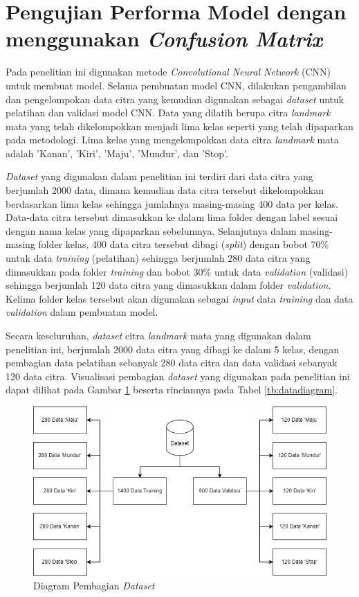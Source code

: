 \section{Pengujian Performa Model dengan menggunakan \emph{Confusion Matrix}}

Pada penelitian ini digunakan metode \emph{Convolutional Neural Network} (CNN) untuk membuat model. Selama pembuatan model CNN, dilakukan pengambilan dan pengelompokan data citra yang kemudian digunakan sebagai \emph{dataset} untuk pelatihan dan validasi model CNN. Data yang dilatih berupa citra \emph{landmark} mata yang telah dikelompokkan menjadi lima kelas seperti yang telah dipaparkan pada metodologi. Lima kelas yang mengelompokkan data citra \emph{landmark} mata adalah 'Kanan', 'Kiri', 'Maju', 'Mundur', dan 'Stop'.

\emph{Dataset} yang digunakan dalam penelitian ini terdiri dari data citra yang berjumlah 2000 data, dimana kemudian data citra tersebut dikelompokkan berdasarkan lima kelas sehingga jumlahnya masing-masing 400 data per kelas. Data-data citra tersebut dimasukkan ke dalam lima folder dengan label sesuai dengan nama kelas yang dipaparkan sebelumnya. Selanjutnya dalam masing-masing folder kelas, 400 data citra tersebut dibagi (\emph{split}) dengan bobot 70\% untuk data \emph{training} (pelatihan) sehingga berjumlah 280 data citra yang dimasukkan pada folder \emph{training }dan bobot 30\% untuk data \emph{validation} (validasi) sehingga berjumlah 120 data citra yang dimasukkan dalam folder \emph{validation}. Kelima folder kelas tersebut akan digunakan sebagai \emph{input} data \emph{training} dan data \emph{validation} dalam pembuatan model.

Secara keseluruhan, \emph{dataset} citra \emph{landmark} mata yang digunakan dalam penelitian ini, berjumlah 2000 data citra yang dibagi ke dalam 5 kelas, dengan pembagian data pelatihan sebanyak 280 data citra dan data validasi sebanyak 120 data citra. Visualisasi pembagian \emph{dataset} yang digunakan pada penelitian ini dapat dilihat pada Gambar \ref{fig:dataset} beserta rinciannya pada Tabel \ref{tb:datadiagram}.

\begin{figure} [ht] \centering
  \includegraphics[width=1\textwidth]{gambar/bab4/visualdataset.png}
  \caption{Diagram Pembagian \emph{Dataset}}
  \label{fig:dataset}
\end{figure}

